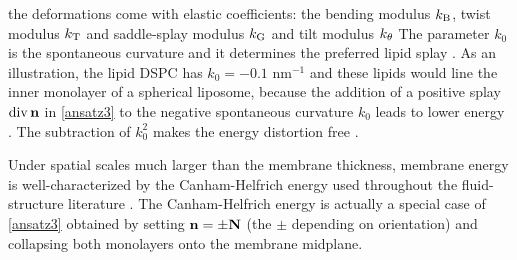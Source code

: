 the deformations come with elastic coefficients: the bending modulus $k_{\mathrm{B}}$, twist modulus $k_{\mathrm{T}}$ 
and saddle-splay modulus $k_{\mathrm{G}}$ and tilt modulus $k_{\theta}$
%
The parameter $k_0$ is the  spontaneous curvature and it determines the preferred lipid splay \cite{RoLi15,Kozlov2007}. 
As an illustration, the lipid DSPC has $k_0 = -0.1$ nm$^{-1}$ 
and these lipids would line the  inner monolayer of a 
spherical liposome, because the addition of a positive splay $\operatorname{div} \mathbf{n}$  in \eqref{ansatz3}
to the negative spontaneous curvature $k_0$ leads to lower energy \cite{Kamal22245, C3SM51829A, RoLi15,FriedSeguin15}.
The subtraction of $k_0^2$ makes the energy distortion free
\cite{Helfrich73,PhysRevLett.113.248102,Hamm2000}.

Under spatial scales much larger than the
membrane thickness, membrane energy is well-characterized by the
Canham-Helfrich energy used throughout the fluid-structure literature
\cite{QiangDu09, Lowengrub07,KimLai2010_JCP, Hu, HuLaiSeolEtAl2016_JCP,
  qua-bir2014, qua-vee-you2019}.
The Canham-Helfrich energy is actually a special case of
\eqref{ansatz3} obtained by setting ${\bf n} =  \pm {\bf N}$ (the $\pm$ depending on
orientation) and collapsing both monolayers onto the membrane midplane.




